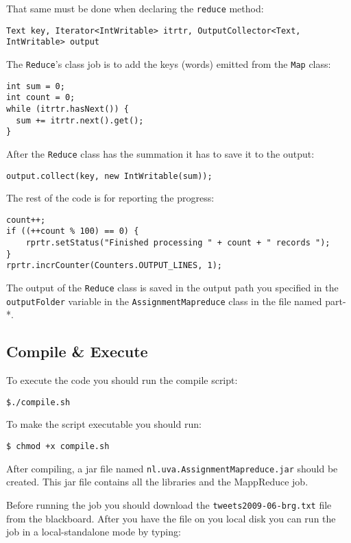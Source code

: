 \documentclass[a4paper,10pt]{article}
\begin{document}
That same must be done when declaring the \texttt{reduce} method:
\begin{lstlisting}
Text key, Iterator<IntWritable> itrtr, OutputCollector<Text, IntWritable> output
\end{lstlisting}


The \texttt{Reduce}'s class job is to add the keys (words) emitted from the \texttt{Map} class: 
\begin{lstlisting}
int sum = 0;
int count = 0;
while (itrtr.hasNext()) {
  sum += itrtr.next().get();
}
\end{lstlisting}


After the \texttt{Reduce} class has the summation it has to save it to the output: 

\begin{lstlisting}
output.collect(key, new IntWritable(sum));
\end{lstlisting}


The rest of the code is for reporting the progress:

\begin{lstlisting}
count++;
if ((++count % 100) == 0) {
    rprtr.setStatus("Finished processing " + count + " records ");
}
rprtr.incrCounter(Counters.OUTPUT_LINES, 1);
\end{lstlisting}

The output of the \texttt{Reduce} class is saved in the output path you specified in the \texttt{outputFolder} variable in the \texttt{AssignmentMapreduce} class in the file named part-*. 

\subsection{Compile \& Execute}

To execute the code you should run the compile script:
\lstset{language=}
\begin{lstlisting}
$./compile.sh 
\end{lstlisting}

To make the script executable you should run:
\begin{lstlisting}
$ chmod +x compile.sh
\end{lstlisting}

After compiling, a jar file named \texttt{nl.uva.AssignmentMapreduce.jar} should be created. This jar file contains all the libraries and the MappReduce job. 

Before running the job you should download the \texttt{tweets2009-06-brg.txt} file from the blackboard. 
After you have the file on you local disk you can run the job in a local-standalone mode by typing:
\end{document}
